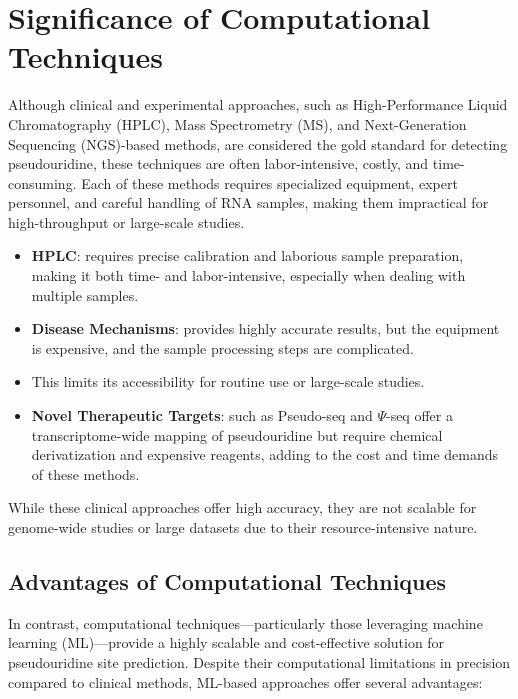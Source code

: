\section{Significance of Computational Techniques}\label{sec:significance-of-computational-techniques}
  Although clinical and experimental approaches, such as High-Performance Liquid Chromatography (HPLC), Mass Spectrometry (MS), and Next-Generation Sequencing (NGS)-based methods, are considered the gold standard for detecting pseudouridine, these techniques are often labor-intensive, costly, and time-consuming.
  Each of these methods requires specialized equipment, expert personnel, and careful handling of RNA samples, making them impractical for high-throughput or large-scale studies.

  \begin{itemize}
    \item \textbf{HPLC}: requires precise calibration and laborious sample preparation, making it both time- and labor-intensive, especially when dealing with multiple samples.
    \item \textbf{Disease Mechanisms}: provides highly accurate results, but the equipment is expensive, and the sample processing steps are complicated.
    \item This limits its accessibility for routine use or large-scale studies.
    \item \textbf{Novel Therapeutic Targets}: such as Pseudo-seq and $\Psi$-seq offer a transcriptome-wide mapping of pseudouridine but require chemical derivatization and expensive reagents, adding to the cost and time demands of these methods.
  \end{itemize}

  While these clinical approaches offer high accuracy, they are not scalable for genome-wide studies or large datasets due to their resource-intensive nature.

  \subsection*{Advantages of Computational Techniques}
    In contrast, computational techniques—particularly those leveraging machine learning (ML)—provide a highly scalable and cost-effective solution for pseudouridine site prediction.
    Despite their computational limitations in precision compared to clinical methods, ML-based approaches offer several advantages:

